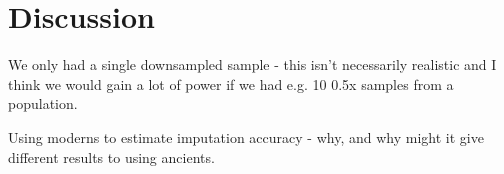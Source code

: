 \section{Discussion}

We only had a single downsampled sample - this isn't necessarily realistic and I think we would gain a lot of power if we had e.g. 10 0.5x samples from a population. 

Using moderns to estimate imputation accuracy - why, and why might it give different results to using ancients. 
